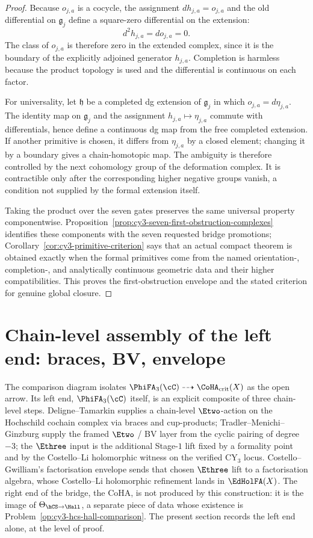 \begin{proof}
Because $o_{j,a}$ is a cocycle, the assignment $d h_{j,a}=o_{j,a}$ and
the old differential on $\mathfrak g_j$ define a square-zero
differential on the extension:
\[
 d^2h_{j,a}=d o_{j,a}=0.
\]
The class of $o_{j,a}$ is therefore zero in the extended complex, since
it is the boundary of the explicitly adjoined generator $h_{j,a}$.
Completion is harmless because the product topology is used and the
differential is continuous on each factor.

For universality, let $\mathfrak h$ be a completed dg extension of
$\mathfrak g_j$ in which $o_{j,a}=d\eta_{j,a}$. The identity map on
$\mathfrak g_j$ and the assignment $h_{j,a}\mapsto\eta_{j,a}$ commute
with differentials, hence define a continuous dg map from the free
completed extension. If another primitive is chosen, it differs from
$\eta_{j,a}$ by a closed element; changing it by a boundary gives a
chain-homotopic map. The ambiguity is therefore controlled by the next
cohomology group of the deformation complex. It is contractible only
after the corresponding higher negative groups vanish, a condition not
supplied by the formal extension itself.

Taking the product over the seven gates preserves the same universal
property componentwise. Proposition~\ref{prop:cy3-seven-first-obstruction-complexes}
identifies these components with the seven requested bridge
promotions; Corollary~\ref{cor:cy3-primitive-criterion} says that an
actual compact theorem is obtained exactly when the formal primitives
come from the named orientation-, completion-, and analytically
continuous geometric data and their higher compatibilities. This proves
the first-obstruction envelope and the stated criterion for genuine
global closure.
\end{proof}

\section{Chain-level assembly of the left end: braces, BV, envelope}
\label{sec:cy3-chain-level-bridge-envelope-stage-one}

The comparison diagram isolates
$\PhiFA_3(\cC)\dashrightarrow\CoHA_{\mathrm{crit}}(X)$ as the open
arrow. Its left end, $\PhiFA_3(\cC)$ itself, is an explicit composite of
three chain-level steps.
Deligne--Tamarkin supplies a chain-level $\Etwo$-action on the
Hochschild cochain complex via braces and cup-products;
Tradler--Menichi--Ginzburg supply the framed $\Etwo$ / BV layer from the
cyclic pairing of degree $-3$; the $\Ethree$ input is the additional
Stage-$1$ lift fixed by a formality point and by the Costello--Li
holomorphic witness on the verified CY$_3$ locus. Costello--Gwilliam's
factorisation envelope sends that chosen $\Ethree$ lift to a
factorisation algebra, whose Costello--Li holomorphic refinement lands
in $\EdHolFA(X)$. The right end of the bridge, the CoHA, is not produced
by this construction: it is the image of $\Theta_{\hCS\to\Hall}$, a
separate piece of data whose existence is
Problem~\ref{op:cy3-hcs-hall-comparison}. The present section records
the left end alone, at the level of proof.

